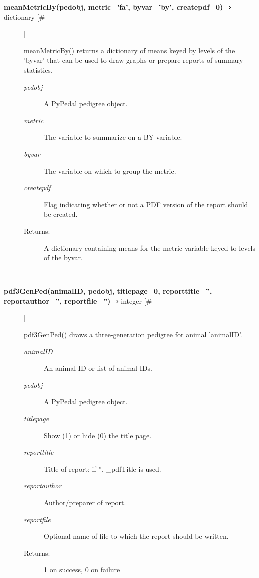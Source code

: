 \documentclass{article}
\begin{document}
\begin{description}
\item[\textbf{meanMetricBy(pedobj, metric='fa', byvar='by', createpdf=0)} ⇒ dictionary [\#]
]
\par meanMetricBy() returns a dictionary of means keyed by levels of the 'byvar' that
can be used to draw graphs or prepare reports of summary statistics.
\begin{description}
\item[\textit{pedobj}
]
A PyPedal pedigree object.
\item[\textit{metric}
]
The variable to summarize on a BY variable.
\item[\textit{byvar}
]
The variable on which to group the metric.
\item[\textit{createpdf}
]
Flag indicating whether or not a PDF version of the report should be created.
\item[Returns:
]
A dictionary containing means for the metric variable keyed to levels of the byvar.
\end{description}\\

\item[\textbf{pdf3GenPed(animalID, pedobj, titlepage=0, reporttitle='', reportauthor='', reportfile='')} ⇒ integer [\#]
]
\par pdf3GenPed() draws a three-generation pedigree for animal 'animalID'.
\begin{description}
\item[\textit{animalID}
]
An animal ID or list of animal IDs.
\item[\textit{pedobj}
]
A PyPedal pedigree object.
\item[\textit{titlepage}
]
Show (1) or hide (0) the title page.
\item[\textit{reporttitle}
]
Title of report; if '', \_pdfTitle is used.
\item[\textit{reportauthor}
]
Author/preparer of report.
\item[\textit{reportfile}
]
Optional name of file to which the report should be written.
\item[Returns:
]
1 on success, 0 on failure
\end{description}\\


\end{description}
\end{document}
